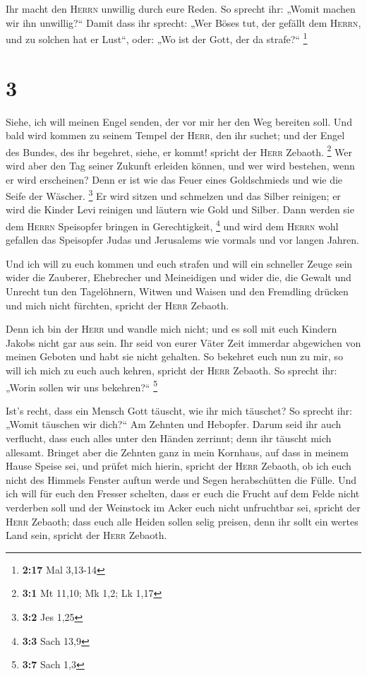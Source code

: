  Ihr macht den \textsc{Herrn} unwillig durch eure Reden.
So sprecht ihr: „Womit machen wir ihn unwillig?{}`` Damit dass ihr
sprecht: „Wer Böses tut, der gefällt dem \textsc{Herrn}, und zu solchen
hat er Lust``, oder: „Wo ist der Gott, der da strafe?{}`` \footnote{\textbf{2:17}
  Mal 3,13-14}

\hypertarget{section-2}{%
\section{3}\label{section-2}}

 Siehe, ich will meinen Engel senden, der vor mir her den
Weg bereiten soll. Und bald wird kommen zu seinem Tempel der
\textsc{Herr}, den ihr suchet; und der Engel des Bundes, des ihr
begehret, siehe, er kommt! spricht der \textsc{Herr} Zebaoth.
\footnote{\textbf{3:1} Mt 11,10; Mk 1,2; Lk 1,17}  Wer
wird aber den Tag seiner Zukunft erleiden können, und wer wird bestehen,
wenn er wird erscheinen? Denn er ist wie das Feuer eines Goldschmieds
und wie die Seife der Wäscher. \footnote{\textbf{3:2} Jes 1,25}
 Er wird sitzen und schmelzen und das Silber reinigen; er
wird die Kinder Levi reinigen und läutern wie Gold und Silber. Dann
werden sie dem \textsc{Herrn} Speisopfer bringen in Gerechtigkeit,
\footnote{\textbf{3:3} Sach 13,9}  und wird dem
\textsc{Herrn} wohl gefallen das Speisopfer Judas und Jerusalems wie
vormals und vor langen Jahren.

 Und ich will zu euch kommen und euch strafen und will ein
schneller Zeuge sein wider die Zauberer, Ehebrecher und Meineidigen und
wider die, die Gewalt und Unrecht tun den Tagelöhnern, Witwen und Waisen
und den Fremdling drücken und mich nicht fürchten, spricht der
\textsc{Herr} Zebaoth.

 Denn ich bin der \textsc{Herr} und wandle mich nicht; und
es soll mit euch Kindern Jakobs nicht gar aus sein.  Ihr
seid von eurer Väter Zeit immerdar abgewichen von meinen Geboten und
habt sie nicht gehalten. So bekehret euch nun zu mir, so will ich mich
zu euch auch kehren, spricht der \textsc{Herr} Zebaoth. So sprecht ihr:
„Worin sollen wir uns bekehren?{}`` \footnote{\textbf{3:7} Sach 1,3}

 Ist's recht, dass ein Mensch Gott täuscht, wie ihr mich
täuschet? So sprecht ihr: „Womit täuschen wir dich?{}`` Am Zehnten und
Hebopfer.  Darum seid ihr auch verflucht, dass euch alles
unter den Händen zerrinnt; denn ihr täuscht mich allesamt.
 Bringet aber die Zehnten ganz in mein Kornhaus, auf dass
in meinem Hause Speise sei, und prüfet mich hierin, spricht der
\textsc{Herr} Zebaoth, ob ich euch nicht des Himmels Fenster auftun
werde und Segen herabschütten die Fülle.  Und ich will
für euch den Fresser schelten, dass er euch die Frucht auf dem Felde
nicht verderben soll und der Weinstock im Acker euch nicht unfruchtbar
sei, spricht der \textsc{Herr} Zebaoth;  dass euch alle
Heiden sollen selig preisen, denn ihr sollt ein wertes Land sein,
spricht der \textsc{Herr} Zebaoth.

